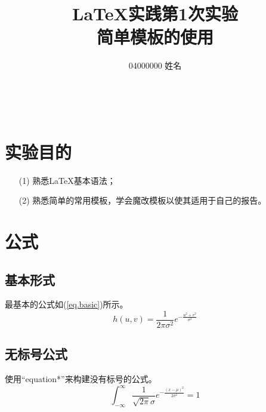 \documentclass[a4paper, 12pt, centering, AutoFakeBold]{article}
\title{\textbf{\LaTeX 实践第1次实验 \\ 简单模板的使用}}
\author{04000000 姓名}
\begin{document}
\
\vspace{16cm}
\begingroup
\let\newpage\relax %
\maketitle
\endgroup
\thispagestyle{empty} %

\restoregeometry
\newpage %
\tableofcontents
\thispagestyle{empty} %


\newpage
\setcounter{page}{1} %

\section{实验目的}
\begin{itemize}
    \item[(1)] 熟悉\LaTeX 基本语法；
    \item[(2)] 熟悉简单的常用模板，学会魔改模板以使其适用于自己的报告。 
\end{itemize}

\section{公式}
\subsection{基本形式}
最基本的公式如(\ref{eq.basic})所示。
\begin{equation} \label{eq.basic}
    h(u, v)=\frac{1}{2 \pi \sigma^{2}} e^{-\frac{u^{2}+v^{2}}{\sigma^{2}}}
\end{equation}

\subsection{无标号公式}
使用“equation*”来构建没有标号的公式。
\begin{equation*}
    \int_{-\infty}^{\infty} \frac{1}{\sqrt{2\pi} \sigma} e^{-\frac{(x-\mu)^2}{2\sigma^2}} = 1
\end{equation*}
\end{document}
